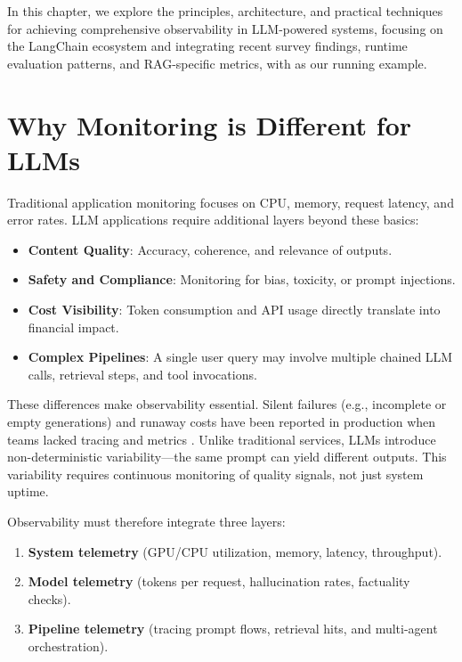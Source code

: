 In this chapter, we explore the principles, architecture, and practical techniques for achieving comprehensive observability in LLM-powered systems, focusing on the LangChain ecosystem and integrating recent survey findings, runtime evaluation patterns, and RAG-specific metrics, with \ishtar{} as our running example.

\section{Why Monitoring is Different for LLMs}
\label{sec:why-monitoring-is-different-for-llms}
Traditional application monitoring focuses on CPU, memory, request latency, and error rates. LLM applications require additional layers beyond these basics:
\begin{itemize}
    \item \textbf{Content Quality}: Accuracy, coherence, and relevance of outputs.
    \item \textbf{Safety and Compliance}: Monitoring for bias, toxicity, or prompt injections.
    \item \textbf{Cost Visibility}: Token consumption and API usage directly translate into financial impact.
    \item \textbf{Complex Pipelines}: A single user query may involve multiple chained LLM calls, retrieval steps, and tool invocations.
\end{itemize}

These differences make observability essential. Silent failures (e.g., incomplete or empty generations) and runaway costs have been reported in production when teams lacked tracing and metrics \cite{udasi2025last9}. Unlike traditional services, LLMs introduce non-deterministic variability---the same prompt can yield different outputs. This variability requires continuous monitoring of quality signals, not just system uptime.

Observability must therefore integrate three layers:
\begin{enumerate}
    \item \textbf{System telemetry} (GPU/CPU utilization, memory, latency, throughput).
    \item \textbf{Model telemetry} (tokens per request, hallucination rates, factuality checks).
    \item \textbf{Pipeline telemetry} (tracing prompt flows, retrieval hits, and multi-agent orchestration).
\end{enumerate}

